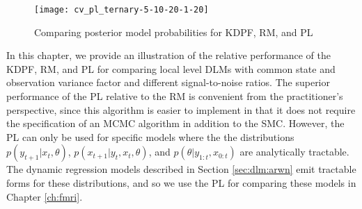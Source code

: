 \begin{figure}[ht]
\ssp
\centering
\caption{Comparing posterior model probabilities for KDPF, RM, and PL} \label{fig:comp:post}
\texttt{[image: cv\_pl\_ternary-5-10-20-1-20]}
\end{figure}

In this chapter, we provide an illustration of the relative performance of the KDPF, RM, and PL for comparing local level DLMs with common state and observation variance factor and different signal-to-noise ratios. The superior performance of the PL relative to the RM is convenient from the practitioner's perspective, since this algorithm is easier to implement in that it does not require the specification of an MCMC algorithm in addition to the SMC. However, the PL can only be used for specific models where the the distributions $p(y_{t+1}|x_t,\theta)$, $p(x_{t+1}|y_t,x_t,\theta)$, and $p(\theta|y_{1:t},x_{0:t})$ are analytically tractable. The dynamic regression models described in Section \ref{sec:dlm:arwn} emit tractable forms for these distributions, and so we use the PL for comparing these models in Chapter \ref{ch:fmri}. 